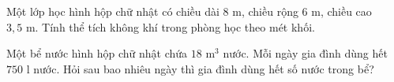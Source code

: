 \begin{ex} %
Một lớp học hình hộp chữ nhật có chiều dài $8\text{ m}$, chiều rộng $6\text{ m}$, chiều cao $3{,}5\text{ m}$. Tính thể tích không khí trong phòng học theo mét khối.
\end{ex}

\begin{ex} %
Một bể nước hình hộp chữ nhật chứa $18\text{ m}^3$ nước. Mỗi ngày gia đình dùng hết $750\text{ l}$ nước. Hỏi sau bao nhiêu ngày thì gia đình dùng hết số nước trong bể?
\end{ex}
